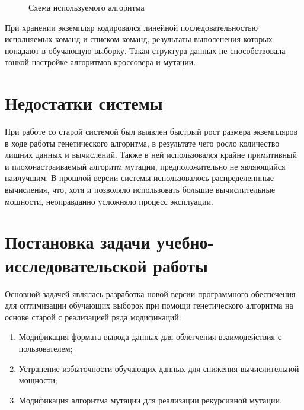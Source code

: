 \documentclass[utf8,usehyperref,14pt]{G7-32}
\begin{document}
\begin{figure}[H]
 \caption{Схема используемого алгоритма}\label{algo}
\end{figure}

При хранении экземпляр кодировался линейной последовательностью исполняемых команд и списком команд, результаты выполенения которых попадают в обучающую выборку. Такая структура данных не способствовала тонкой настройке алгоритмов кроссовера и мутации.

\section{Недостатки системы}
При работе со старой системой был выявлен быстрый рост размера экземпляров в ходе работы генетического алгоритма, в результате чего росло количество лишних данных и вычислений. Также в ней использовался крайне примитивный и плохонастраиваемый алгоритм мутации, предположительно не являющийся наилучшим. В прошлой версии системы использовалось распределеннные вычисления, что, хотя и позволяло использовать большие вычислительные мощности, неоправданно усложняло процесс эксплуации. 
\section{Постановка задачи учебно-исследовательской работы}
Основной задачей являлась разработка новой версии программного обеспечения для оптимизации обучающих выборок при помощи генетического алгоритма на основе старой с реализацией ряда модификаций:
\begin{enumerate}
\item Модификация формата вывода данных для облегчения взаимодействия с пользователем;
\item Устранение избыточности обучающих данных для снижения вычислительной мощности;
\item Модификация алгоритма мутации для реализации рекурсивной мутации.
\end{enumerate}
\end{document}
